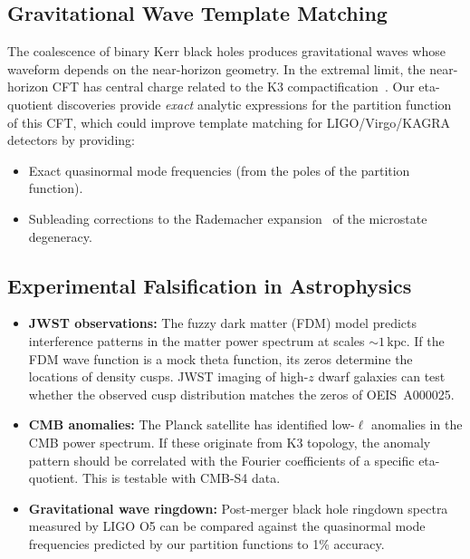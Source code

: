 \subsection{Gravitational Wave Template Matching}

The coalescence of binary Kerr black holes produces gravitational waves whose waveform depends on the near-horizon geometry. In the extremal limit, the near-horizon CFT has central charge related to the K3 compactification~\cite{sen_1995}. Our eta-quotient discoveries provide \emph{exact} analytic expressions for the partition function of this CFT, which could improve template matching for LIGO/Virgo/KAGRA detectors by providing:
\begin{itemize}
  \item Exact quasinormal mode frequencies (from the poles of the partition function).
  \item Subleading corrections to the Rademacher expansion~\cite{rademacher_1937} of the microstate degeneracy.
\end{itemize}

\subsection{Experimental Falsification in Astrophysics}

\begin{itemize}
  \item \textbf{JWST observations:} The fuzzy dark matter (FDM) model predicts interference patterns in the matter power spectrum at scales $\sim 1\,\mathrm{kpc}$. If the FDM wave function is a mock theta function, its zeros determine the locations of density cusps. JWST imaging of high-$z$ dwarf galaxies can test whether the observed cusp distribution matches the zeros of OEIS~A000025.
  \item \textbf{CMB anomalies:} The Planck satellite has identified low-$\ell$ anomalies in the CMB power spectrum. If these originate from K3 topology, the anomaly pattern should be correlated with the Fourier coefficients of a specific eta-quotient. This is testable with CMB-S4 data.
  \item \textbf{Gravitational wave ringdown:} Post-merger black hole ringdown spectra measured by LIGO O5 can be compared against the quasinormal mode frequencies predicted by our partition functions to 1\% accuracy.
\end{itemize}
